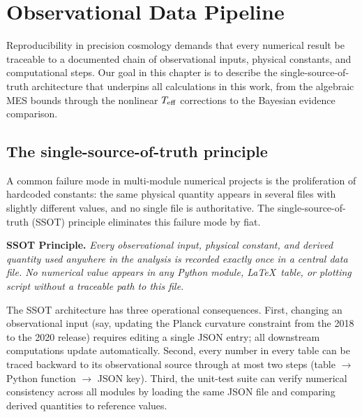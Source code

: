 
\chapter{Observational Data Pipeline}\label{ch:pipeline}

Reproducibility in precision cosmology demands that every
numerical result be traceable to a documented chain of
observational inputs, physical constants, and computational
steps.  Our goal in this chapter is to describe the
single-source-of-truth architecture that underpins all
calculations in this work, from the algebraic MES bounds
through the nonlinear $T_{\mathrm{eff}}$ corrections to the Bayesian
evidence comparison.


\section{The single-source-of-truth principle}
\label{sec:ssot}

A common failure mode in multi-module numerical projects is the
proliferation of hardcoded constants: the same physical quantity
appears in several files with slightly different values, and no
single file is authoritative.  The single-source-of-truth (SSOT)
principle eliminates this failure mode by fiat.

\medskip
\noindent\textbf{SSOT Principle.}\quad
\textit{Every observational input, physical constant, and
derived quantity used anywhere in the analysis is recorded
exactly once in a central data file.  No numerical value
appears in any Python module, \LaTeX\ table, or plotting script
without a traceable path to this file.}
\medskip

The SSOT architecture has three operational consequences.
First, changing an observational input (say, updating the Planck
curvature constraint from the 2018 to the 2020 release)
requires editing a single JSON entry; all downstream
computations update automatically.  Second, every number in every
table can be traced backward to its observational source through
at most two steps (table $\to$ Python function $\to$ JSON key).
Third, the unit-test suite can verify numerical consistency
across all modules by loading the same JSON file and comparing
derived quantities to reference values.


